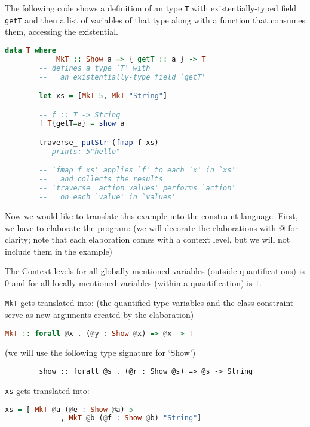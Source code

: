\begin{ex}[Existentials]
    The following code shows a definition of an type \lstinline{T} with existentially-typed field \lstinline{getT} and then a list of variables of that type along with a function that consumes them, accessing the existential. 

    \begin{lstlisting}[language=Haskell]
        data T where
            MkT :: Show a => { getT :: a } -> T
        -- defines a type `T' with
        --   an existentially-type field `getT'

        let xs = [MkT 5, MkT "String"]

        -- f :: T -> String
        f T{getT=a} = show a

        traverse_ putStr (fmap f xs)
        -- prints: 5"hello"

        -- `fmap f xs' applies `f' to each `x' in `xs'
        --   and collects the results
        -- `traverse_ action values' performs `action'
        --   on each `value' in `values'
    \end{lstlisting}

    Now we would like to translate this example into the constraint language. First, we have to elaborate the program: (we will decorate the elaborations with $@$ for clarity; note that each elaboration comes with a context level, but we will not include them in the example)

    The Context levels for all globally-mentioned variables (outside quantifications) is $0$ and for all locally-mentioned variables (within a quantification) is $1$.

    \lstinline{MkT} gets translated into: (the quantified type variables and the class constraint serve as new arguments created by the elaboration)
    \begin{lstlisting}[language=Haskell]
        MkT :: forall @x . (@y : Show @x) => @x -> T
    \end{lstlisting}

    (we will use the following type signature for `Show')
    \begin{lstlisting}
        show :: forall @s . (@r : Show @s) => @s -> String
    \end{lstlisting}

    \lstinline{xs} gets translated into: 

    \begin{lstlisting}[language=Haskell]
        xs = [ MkT @a (@e : Show @a) 5
             , MkT @b (@f : Show @b) "String"]
    \end{lstlisting}


\end{ex}
